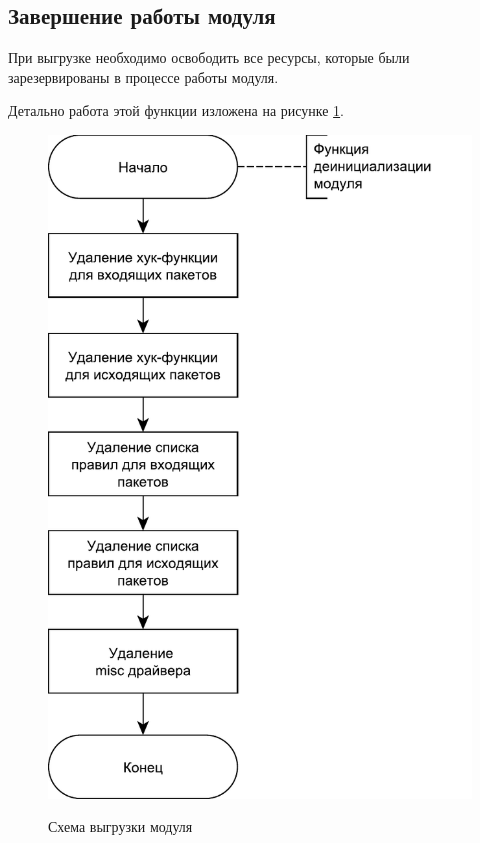\newpage

\subsection{Завершение работы модуля}
При выгрузке необходимо освободить все ресурсы, которые были зарезервированы в процессе работы модуля. 

Детально работа этой функции изложена на рисунке \ref{fig4:image}.
\begin{figure}[h!]
	\begin{center}
		{\includegraphics[scale = 0.6]{img/exit.pdf}}
		\caption{Схема выгрузки модуля}
		\label{fig4:image}
	\end{center}
\end{figure}

